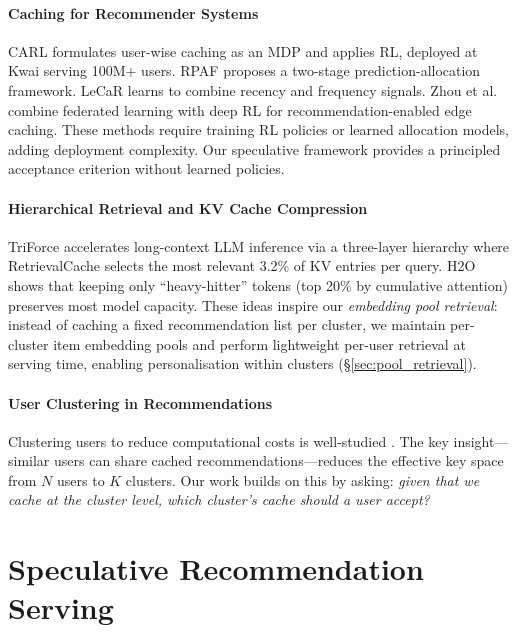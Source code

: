 \documentclass{article}
\begin{document}
\paragraph{Caching for Recommender Systems}
CARL \citep{carl2024} formulates user-wise caching as an MDP and applies RL, deployed at Kwai serving 100M+ users. RPAF \citep{rpaf2024} proposes a two-stage prediction-allocation framework. LeCaR \citep{lecar2018} learns to combine recency and frequency signals. Zhou et al.~\citep{fed_drl_cache2024} combine federated learning with deep RL for recommendation-enabled edge caching. These methods require training RL policies or learned allocation models, adding deployment complexity. Our speculative framework provides a principled acceptance criterion without learned policies.

\paragraph{Hierarchical Retrieval and KV Cache Compression}
TriForce \citep{triforce2024} accelerates long-context LLM inference via a three-layer hierarchy where RetrievalCache selects the most relevant 3.2\% of KV entries per query. H2O \citep{h2o2023} shows that keeping only ``heavy-hitter'' tokens (top 20\% by cumulative attention) preserves most model capacity. These ideas inspire our \emph{embedding pool retrieval}: instead of caching a fixed recommendation list per cluster, we maintain per-cluster item embedding pools and perform lightweight per-user retrieval at serving time, enabling personalisation within clusters (\S\ref{sec:pool_retrieval}).

\paragraph{User Clustering in Recommendations}
Clustering users to reduce computational costs is well-studied \citep{cf_cluster_survey2024, cluster_cf2021}. The key insight---similar users can share cached recommendations---reduces the effective key space from $N$ users to $K$ clusters. Our work builds on this by asking: \emph{given that we cache at the cluster level, which cluster's cache should a user accept?}

\section{Speculative Recommendation Serving}
\label{sec:method}
\end{document}
